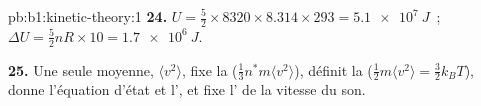 \begin{solution}{pb:b1:kinetic-theory:1}
\textbf{24.} $U = \tfrac52 \times 8320 \times 8.314 \times 293 = \qty{5.1e7}{J}$~;
$\Delta U = \tfrac52 nR \times 10 = \qty{1.7e6}{J}$.

\textbf{25.} Une seule moyenne, $\langle v^2\rangle$, fixe la 
($\tfrac13 n^*m\langle v^2\rangle$), définit la 
($\tfrac12 m\langle v^2\rangle = \tfrac32 k_BT$), donne l'équation d'état
et l', et fixe l' de la vitesse du son.
\end{solution}
